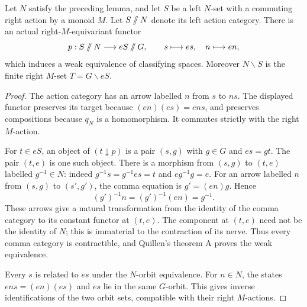 \begin{lemma}
\label{C:opposite-corner-action-groupoid}
Let $N$ satisfy the preceding lemma, and let $S$ be a left
$N$-set with a commuting right action by a monoid $M$.
Let $S\mathbin{/\mkern-6mu/}N$ denote its left action category.
There is an actual right-$M$-equivariant functor
\[
 p:S\mathbin{/\mkern-6mu/}N
       \longrightarrow eS\mathbin{/\mkern-6mu/}G,
 \qquad s\longmapsto es,\quad n\longmapsto en,
\]
which induces a weak equivalence of classifying spaces.
Moreover $N\backslash S$ is the finite right $M$-set
$T=G\backslash eS$.
\end{lemma}
\begin{proof}
The action category has an arrow labelled $n$ from $s$ to $ns$.
The displayed functor preserves its target because
$(en)(es)=ens$, and preserves compositions because $q_N$ is a
homomorphism. It commutes strictly with the right $M$-action.

For $t\in eS$, an object of $(t\downarrow p)$ is a pair $(s,g)$
with $g\in G$ and $es=gt$. The pair $(t,e)$ is one such object.
There is a morphism from $(s,g)$ to $(t,e)$ labelled $g^{-1}\in N$:
indeed $g^{-1}s=g^{-1}es=t$ and $e g^{-1}g=e$.
For an arrow labelled $n$ from $(s,g)$ to $(s',g')$, the comma
equation is $g'=(en)g$. Hence
\[
 (g')^{-1}n=(g')^{-1}(en)=g^{-1}.
\]
These arrows give a natural transformation from the identity of
the comma category to its constant functor at $(t,e)$.
The component at $(t,e)$ need not be the identity of $N$;
this is immaterial to the contraction of its nerve.
Thus every comma category is contractible, and Quillen's theorem A
proves the weak equivalence.

Every $s$ is related to $es$ under the $N$-orbit equivalence.
For $n\in N$, the states $ens=(en)(es)$ and $es$ lie in the same
$G$-orbit. This gives inverse identifications of the two orbit
sets, compatible with their right $M$-actions.
\end{proof}


